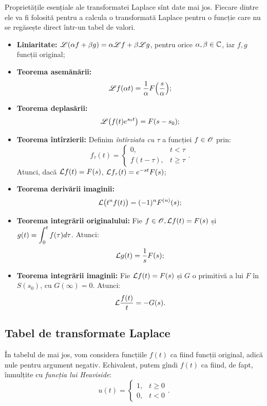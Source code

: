 Proprietățile esențiale ale transformatei Laplace sînt date mai jos. Fiecare dintre ele
va fi folosită pentru a calcula o transformată Laplace pentru o funcție care nu se
regăsește direct într-un tabel de valori.

\begin{itemize}
\item \textbf{Liniaritate:} $ \mathscr{L}(\alpha f + \beta g) = \alpha \mathscr{L} f + \beta \mathscr{L} g $,
  pentru orice $ \alpha, \beta \in \mathbb{C} $, iar $ f, g $ funcții original;
\item \textbf{Teorema asemănării:}
  \[
    \mathscr{L} f(\alpha t) = \dfrac{1}{\alpha} F \Big( \dfrac{s}{\alpha} \Big);
  \]
\item \textbf{Teorema deplasării:}
  \[
    \mathscr{L} \big( f(t) e^{s_0t} \big) = F(s - s_0);
  \]
\item \textbf{Teorema întîrzierii:} Definim \emph{întîrziata cu $ \tau $ } a funcției
  $ f \in \mathscr{O} $ prin:
  \[
    f_\tau(t) =
    \begin{cases}
      0, & t < \tau \\
      f(t - \tau), & t \geq \tau
    \end{cases}.
  \]
  Atunci, dacă $ \mathcal{L} f(t) = F(s) $, $ \mathcal{L} f_\tau (t) = e^{-st} F(s) $;
\item \textbf{Teorema derivării imaginii:}
  \[
    \mathcal{L} \big( t^n f(t) \big) = (-1)^n F^{(n)} (s);
  \]
\item \textbf{Teorema integrării originalului:} Fie $ f \in \mathscr{O}, \mathcal{L} f(t) = F(s) $ și
  $ g(t) = \displaystyle\int_0^t f(\tau) d\tau $. Atunci:
  \[
    \mathcal{L} g(t) = \dfrac{1}{s} F(s);
  \]
\item \textbf{Teorema integrării imaginii:} Fie $ \mathcal{L} f(t) = F(s) $ și $ G $ o primitivă a
  lui $ F $ în $ S(s_0) $, cu $ G(\infty) = 0 $. Atunci:
  \[
    \mathcal{L} \dfrac{f(t)}{t} = -G(s).
  \]
\end{itemize}

\newpage
\subsection{Tabel de transformate Laplace}

\indent\indent În tabelul de mai jos, vom considera funcțiile $ f(t) $ ca fiind funcții original,
adică nule pentru argument negativ. Echivalent, putem gîndi $ f(t) $ ca fiind, de fapt,
înmulțite cu \emph{funcția lui Heaviside}:
\[
  u(t) =
  \begin{cases}
    1, & t \geq 0 \\
    0, & t < 0 
  \end{cases}.
\]

